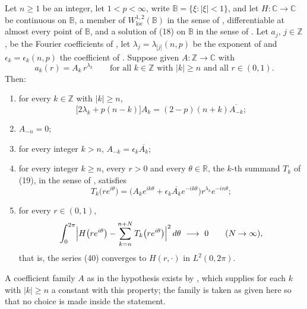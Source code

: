 \begin{lemma}
Let $n\ge1$ be an integer, let $1<p<\infty$, write
$\mathbb{B}=\{\xi:|\xi|<1\}$, and let $H\colon\mathbb{C}\to\mathbb{C}$ be
continuous on $\mathbb{B}$, a member of $W^{1,2}_{\mathrm{loc}}(\mathbb{B})$ in
the sense of , differentiable at almost every point of
$\mathbb{B}$, and a solution of (18) on $\mathbb{B}$ in the sense of
.  Let $a_j$,
$j\in\mathbb{Z}$, be the Fourier coefficients of , let
$\lambda_j=\lambda_{|j|}(n,p)$ be the exponent of  and
$\epsilon_k=\epsilon_k(n,p)$ the coefficient of .  Suppose
given $A\colon\mathbb{Z}\to\mathbb{C}$ with
\[
  a_k(r)=A_k\,r^{\lambda_k}\qquad\text{for all }k\in\mathbb{Z}\text{ with }|k|\ge n
  \text{ and all }r\in(0,1).
\]
Then:
\begin{enumerate}
\item[(38)] for every $k\in\mathbb{Z}$ with $|k|\ge n$,
\[
  \bigl[2\lambda_k+p(n-k)\bigr]A_k=(2-p)(n+k)\overline{A_{-k}};
\]
\item[(a)] $A_{-n}=0$;
\item[(39)] for every integer $k>n$, $A_{-k}=\epsilon_k\overline{A_k}$;
\item[(b)] for every integer $k\ge n$, every $r>0$ and every
$\theta\in\mathbb{R}$, the $k$-th summand $T_k$ of (19), in the sense of
, satisfies
\[
  T_k\bigl(re^{i\theta}\bigr)
  =\bigl(A_ke^{ik\theta}+\epsilon_k\overline{A_k}e^{-ik\theta}\bigr)r^{\lambda_k}e^{-in\theta};
\]
\item[(40)] for every $r\in(0,1)$,
\[
  \int_0^{2\pi}\Bigl|H\bigl(re^{i\theta}\bigr)
    -\sum_{k=n}^{n+N}T_k\bigl(re^{i\theta}\bigr)\Bigr|^2\,d\theta\ \longrightarrow\ 0
  \qquad(N\to\infty),
\]
that is, the series (40) converges to $H(r,\cdot)$ in $L^2(0,2\pi)$.
\end{enumerate}
A coefficient family $A$ as in the hypothesis exists by ,
which supplies for each $k$ with $|k|\ge n$ a constant with this property; the
family is taken as given here so that no choice is made inside the statement.
\end{lemma}
